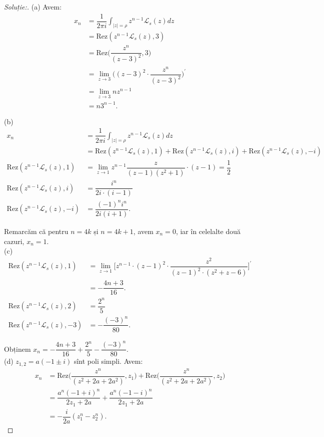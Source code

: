 \documentclass[12pt,a4paper]{article}
\newcommand\Lap{\mathcal{L}}
\newcommand\Rez{\mathrm{Rez}}
\theoremstyle{dotless}
\theoremstyle{dotlessdr}
\newenvironment{solution}
{\begin{proof}[Soluție:\nopunct]}
  {\end{proof}}
\begin{document}
\begin{solution}
(a) Avem:
\begin{align*}
x_n &= \dfrac{1}{2\pi i} \int_{|z| = \rho} z^{n-1} \Lap_s (z) dz \\
    &= \Rez(z^{n-1} \Lap_s(z), 3) \\
    &= \Rez \Big( \dfrac{z^n}{(z-3)^2}, 3 \Big) \\
    &= \lim_{z \to 3} \Big( (z-3)^2 \cdot \dfrac{z^n}{(z-3)^2} \Big)^{\prime} \\
    &= \lim_{z \to 3} nz^{n-1} \\
    &= n3^{n-1}.
\end{align*}

(b)
\begin{align*}
x_n &= \dfrac{1}{2 \pi i} \int_{|z| = \rho} z^{n-1} \Lap_s(z) dz \\
    &= \Rez(z^{n-1} \Lap_s (z), 1) + \Rez(z^{n-1} \Lap_s(z), i) + 
    \Rez(z^{n-1} \Lap_s(z), -i) \\
\Rez(z^{n-1}\Lap_s(z),1) &= \lim_{z \to 1} z^{n-1} \dfrac{z}{(z - 1)(z^2 + 1)} 
\cdot (z-1) = \dfrac{1}{2} \\
\Rez(z^{n-1} \Lap_s(z), i) &= \dfrac{i^n}{2i \cdot (i-1)} \\
\Rez(z^{n-1} \Lap_s(z), -i) &= \dfrac{(-1)^n i^n}{2i(i+1)}.
\end{align*}

Remarcăm că pentru $n = 4k$ și $n = 4k+1$, avem $x_n = 0$, iar în celelalte 
două cazuri, $x_n = 1$. \\

(c)
\begin{align*}
\Rez(z^{n-1} \Lap_s(z), 1) &= \lim_{z\to 1} \Big[ z^{n-1} \cdot (z-1)^2 \cdot 
\dfrac{z^2}{(z-1)^2 \cdot (z^2 + z - 6)} \Big]^{\prime}\\
                       &= - \dfrac{4n + 3}{16}. \\
\Rez(z^{n-1} \Lap_s(z), 2) &= \dfrac{2^n}{5} \\
\Rez(z^{n-1} \Lap_s(z), -3) &= -\dfrac{(-3)^n}{80}.
\end{align*}

Obținem $x_n = - \dfrac{4n+3}{16} + \dfrac{2^n}{5} - \dfrac{(-3)^n}{80}$. \\

(d) $z_{1,2} = a (-1 \pm i)$ sînt poli simpli. Avem:
\begin{align*}
x_n &= \Rez\Big( \dfrac{z^n}{(z^2 + 2a + 2a^2)}, z_1 \Big) + 
\Rez\Big(  \dfrac{z^n}{(z^2 + 2a + 2a^2)}, z_2 \Big) \\
    &= \dfrac{a^n(-1 + i)^n}{2z_1 + 2a} + \dfrac{a^n(-1-i)^n}{2z_1 + 2a} \\
    &= -\dfrac{i}{2a}(z_1^n - z_2^n).
\end{align*}


\end{solution}
\end{document}
